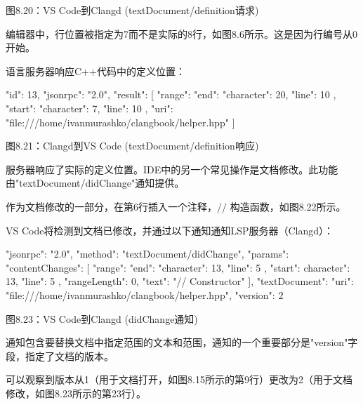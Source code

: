 \begin{center}
图8.20：VS Code到Clangd (textDocument/definition请求)
\end{center}

编辑器中，行位置被指定为7而不是实际的8行，如图8.6所示。这是因为行编号从0开始。

语言服务器响应C++代码中的定义位置：

\begin{shell}
{
  "id": 13,
  "jsonrpc": "2.0",
  "result": [
  {
    "range": {
      "end": {
        "character": 20,
        "line": 10
      },
      "start": {
        "character": 7,
        "line": 10
      }
    },
    "uri": "file:///home/ivanmurashko/clangbook/helper.hpp"
  }
  ]
}
\end{shell}

\begin{center}
图8.21：Clangd到VS Code (textDocument/definition响应)
\end{center}

服务器响应了实际的定义位置。IDE中的另一个常见操作是文档修改。此功能由"textDocument/didChange"通知提供。


作为文档修改的一部分，在第6行插入一个注释，// 构造函数，如图8.22所示。


VS Code将检测到文档已修改，并通过以下通知通知LSP服务器（Clangd）：

\begin{shell}
{
  "jsonrpc": "2.0",
  "method": "textDocument/didChange",
  "params": {
    "contentChanges": [
      {
        "range": {
          "end": {
            "character": 13,
            "line": 5
          },
          "start": {
            character": 13,
            "line": 5
          }
        },
        "rangeLength": 0,
        "text": "// Constructor"
      }
    ],
    "textDocument": {
      "uri": "file:///home/ivanmurashko/clangbook/helper.hpp",
      "version": 2
    }
  }
}
\end{shell}

\begin{center}
图8.23：VS Code到Clangd (didChange通知)
\end{center}

通知包含要替换文档中指定范围的文本和范围，通知的一个重要部分是"version"字段，指定了文档的版本。

可以观察到版本从1（用于文档打开，如图8.15所示的第9行）更改为2（用于文档修改，如图8.23所示的第23行）。

